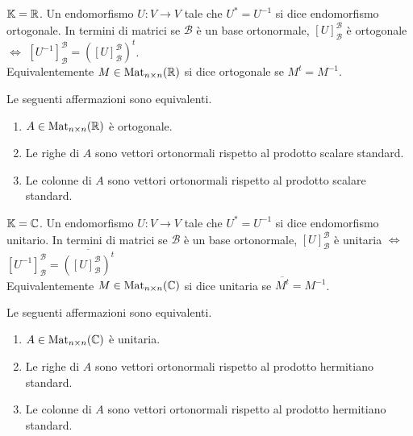 \begin{definition}
	$ \mathbb{K} = \mathbb{R} $. Un endomorfismo $ U \colon V \to V $ tale che $ U^{*} = U^{-1} $ si dice endomorfismo ortogonale. In termini di matrici se $ \mathscr{B} $ è un base ortonormale, $ [U]_{\mathscr{B}}^{\mathscr{B}} $ è ortogonale $ \iff $ $ [U^{-1}]_{\mathscr{B}}^{\mathscr{B}} = ([U]_{\mathscr{B}}^{\mathscr{B}})^t $.\\
	Equivalentemente $ M \in \mathrm{Mat}_{n \times n}(\mathbb{R}) $ si dice ortogonale se $ M^{t} = M^{-1} $.
\end{definition}

\begin{prop}
	Le seguenti affermazioni sono equivalenti.
	\begin{enumerate}[label = (\roman*)]
		\item $ A \in \mathrm{Mat}_{n \times n}(\mathbb{R}) $ è ortogonale.
		\item Le righe di $ A $ sono vettori ortonormali rispetto al prodotto scalare standard.
		\item Le colonne di $ A $ sono vettori ortonormali rispetto al prodotto scalare standard.
	\end{enumerate}
\end{prop}

\begin{definition}
	$ \mathbb{K} = \mathbb{C} $. Un endomorfismo \linebreak $ U \colon V \to V $ tale che $ U^{*} = U^{-1} $ si dice endomorfismo unitario. In termini di matrici se $ \mathscr{B} $ è un base ortonormale, $ [U]_{\mathscr{B}}^{\mathscr{B}} $ è unitaria $ \iff $ $ [U^{-1}]_{\mathscr{B}}^{\mathscr{B}} = \overline{([U]_{\mathscr{B}}^{\mathscr{B}})^{t}} $\\
	Equivalentemente $ M \in \mathrm{Mat}_{n \times n}(\mathbb{C}) $ si dice unitaria se $ \overline{M^{t}} = M^{-1} $.
\end{definition}

\begin{prop}
	Le seguenti affermazioni sono equivalenti.
	\begin{enumerate}[label = (\roman*)]
		\item $ A \in \mathrm{Mat}_{n \times n}(\mathbb{C}) $ è unitaria.
		\item Le righe di $ A $ sono vettori ortonormali rispetto al prodotto hermitiano standard.
		\item Le colonne di $ A $ sono vettori ortonormali rispetto al prodotto hermitiano standard.
	\end{enumerate}
\end{prop}

